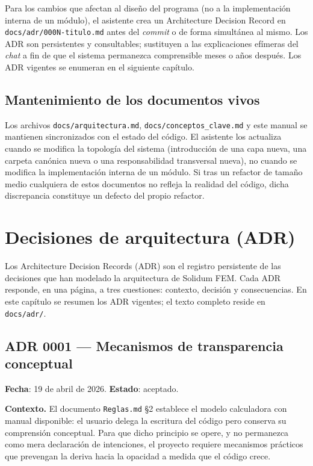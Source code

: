 \documentclass[11pt,oneside]{report}
\begin{document}
Para los cambios que afectan al diseño del programa (no a la implementación interna de un módulo), el asistente crea un Architecture Decision Record en \texttt{docs/\allowbreak{}adr/\allowbreak{}000N-titulo.\allowbreak{}md} antes del \textit{commit} o de forma simultánea al mismo. Los ADR son persistentes y consultables; sustituyen a las explicaciones efímeras del \textit{chat} a fin de que el sistema permanezca comprensible meses o años después. Los ADR vigentes se enumeran en el siguiente capítulo.

\section{Mantenimiento de los documentos vivos}

Los archivos \texttt{docs/\allowbreak{}arquitectura.\allowbreak{}md}, \texttt{docs/\allowbreak{}conceptos\_\allowbreak{}clave.\allowbreak{}md} y este manual se mantienen sincronizados con el estado del código. El asistente los actualiza cuando se modifica la topología del sistema (introducción de una capa nueva, una carpeta canónica nueva o una responsabilidad transversal nueva), no cuando se modifica la implementación interna de un módulo. Si tras un refactor de tamaño medio cualquiera de estos documentos no refleja la realidad del código, dicha discrepancia constituye un defecto del propio refactor.


\newpage

\chapter{Decisiones de arquitectura (ADR)}
\label{cap:8}



Los Architecture Decision Records (ADR) son el registro persistente de las decisiones que han modelado la arquitectura de Solidum FEM. Cada ADR responde, en una página, a tres cuestiones: contexto, decisión y consecuencias. En este capítulo se resumen los ADR vigentes; el texto completo reside en \texttt{docs/adr/}.

\section{ADR 0001 --- Mecanismos de transparencia conceptual}
\label{adr:0001}

\textbf{Fecha}: 19 de abril de 2026. \textbf{Estado}: aceptado.

\textbf{Contexto.} El documento \texttt{Reglas.md} §2 establece el modelo \textquotedbl{}calculadora con manual disponible\textquotedbl{}: el usuario delega la escritura del código pero conserva su comprensión conceptual. Para que dicho principio se opere, y no permanezca como mera declaración de intenciones, el proyecto requiere mecanismos prácticos que prevengan la deriva hacia la opacidad a medida que el código crece.
\end{document}
